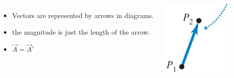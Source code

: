 \documentclass[]{beamer}
\begin{document}
      \begin{frame}
      
      
      
         \begin{columns}[c]
         \column{2.5in}  %
        
      
      \begin{itemize}
      \item Vectors are represented by arrows in diagrams. 
      
      \item the magnitude is just the length of the arrow.
      
      
      \item $\vec{A}=\vec{A}'$
      \end{itemize}
      
      
         \column{2in}
      
      
        \begin{center}
        \includegraphics[height=1.5in]{images/vector.jpg}
      \end{center}
      
      
         \end{columns}
      
      
      
      
      \end{frame}
      
      
\end{document}
